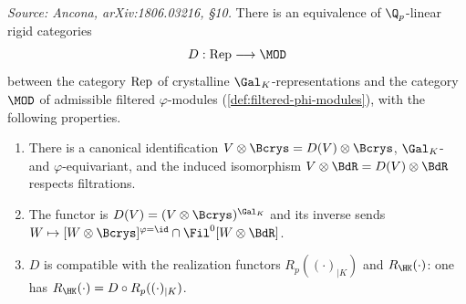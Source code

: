\begin{theorem}
  \label{thm:crys-equiv}
  \textit{Source: Ancona, arXiv:1806.03216, \S10.}
  There is an equivalence of \(\Q_p\)-linear rigid categories
  \[D : \REP \longrightarrow \MOD\]
  between the category \(\mathrm{Rep}\) of crystalline \(\Gal_K\)-representations and the
  category \(\MOD\) of admissible filtered \(\varphi\)-modules
  (\cref{def:filtered-phi-modules}), with the following properties.
  \begin{enumerate}
    \item There is a canonical identification \(V \otimes \Bcrys = D(V) \otimes
      \Bcrys\), \(\Gal_K\)- and \(\varphi\)-equivariant, and the induced
      isomorphism \(V \otimes \BdR = D(V) \otimes \BdR\) respects filtrations.
    \item The functor is \(D(V) = (V \otimes \Bcrys)^{\Gal_K}\) and its inverse
      sends \(W \mapsto [W \otimes \Bcrys]^{\varphi=\id} \cap \Fil^0[W \otimes
      \BdR]\).
    \item \(D\) is compatible with the realization functors \(R_p((\cdot)_{\vert
      K})\) and \(R_\HK(\cdot)\): one has \(R_\HK(\cdot) = D \circ R_p((\cdot)_{\vert
      K})\).
  \end{enumerate}
\end{theorem}

